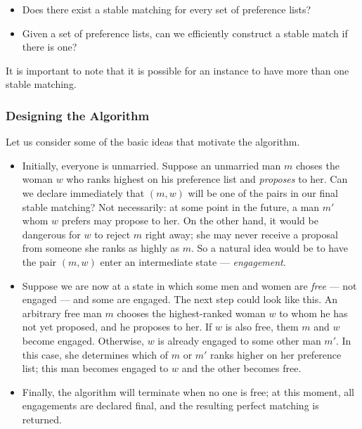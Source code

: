 \documentclass{article}
\begin{document}
\begin{itemize}
  \item Does there exist a stable matching for every set of preference lists?
  \item Given a set of preference lists, can we efficiently construct a stable
    match if there is one?
\end{itemize}

It is important to note that it is possible for an instance to have
more than one stable matching.

\subsubsection{Designing the Algorithm}\label{ssub:designing_the_algorithm}

Let us consider some of the basic ideas that motivate the algorithm.

\begin{itemize}
  \item Initially, everyone is unmarried. Suppose an unmarried man \(m\)
    choses the woman \(w\) who ranks highest on his preference list and
    \emph{proposes} to her. Can we declare immediately that \((m,w)\) will
    be one of the pairs in our final stable matching? Not necessarily: at
    some point in the future, a man \(m'\) whom \(w\) prefers may propose
    to her. On the other hand, it would be dangerous for \(w\) to reject
    \(m\) right away; she may never receive a proposal from someone she
    ranks as highly as \(m\). So a natural idea would be to have the pair
    \((m,w)\) enter an intermediate state --- \emph{engagement}.
  \item Suppose we are now at a state in which some men and women are
    \emph{free} --- not engaged --- and some are engaged. The next step
    could look like this. An arbitrary free man \(m\) chooses the
    highest-ranked woman \(w\) to whom he has not yet proposed, and he
    proposes to her. If \(w\) is also free, them \(m\) and \(w\) become
    engaged. Otherwise, \(w\) is already engaged to some other man \(m'\).
    In this case, she determines which of \(m\) or \(m'\) ranks higher on
    her preference list; this man becomes engaged to \(w\) and the other
    becomes free.
  \item Finally, the algorithm will terminate when no one is free; at this
    moment, all engagements are declared final, and the resulting perfect
    matching is returned.
\end{itemize}
\end{document}
